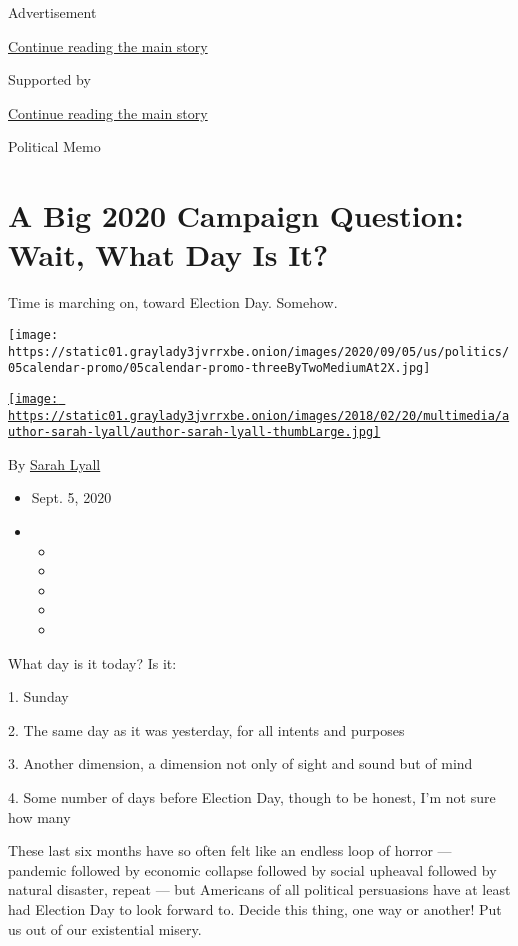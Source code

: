 Advertisement

\protect\hyperlink{after-top}{Continue reading the main story}

Supported by

\protect\hyperlink{after-sponsor}{Continue reading the main story}

Political Memo

\hypertarget{a-big-2020-campaign-question-wait-what-day-is-it}{%
\section{A Big 2020 Campaign Question: Wait, What Day Is
It?}\label{a-big-2020-campaign-question-wait-what-day-is-it}}

Time is marching on, toward Election Day. Somehow.

\texttt{[image: https://static01.graylady3jvrrxbe.onion/images/2020/09/05/us/politics/05calendar-promo/05calendar-promo-threeByTwoMediumAt2X.jpg]}

\href{https://www.nytimes3xbfgragh.onion/by/sarah-lyall}{\texttt{[image: https://static01.graylady3jvrrxbe.onion/images/2018/02/20/multimedia/author-sarah-lyall/author-sarah-lyall-thumbLarge.jpg]}}

By \href{https://www.nytimes3xbfgragh.onion/by/sarah-lyall}{Sarah Lyall}

\begin{itemize}
\item
  Sept. 5, 2020
\item
  \begin{itemize}
  \item
  \item
  \item
  \item
  \item
  \end{itemize}
\end{itemize}

What day is it today? Is it:

1. Sunday

2. The same day as it was yesterday, for all intents and purposes

3. Another dimension, a dimension not only of sight and sound but of
mind

4. Some number of days before Election Day, though to be honest, I'm not
sure how many

These last six months have so often felt like an endless loop of horror
--- pandemic followed by economic collapse followed by social upheaval
followed by natural disaster, repeat --- but Americans of all political
persuasions have at least had Election Day to look forward to. Decide
this thing, one way or another! Put us out of our existential misery.

